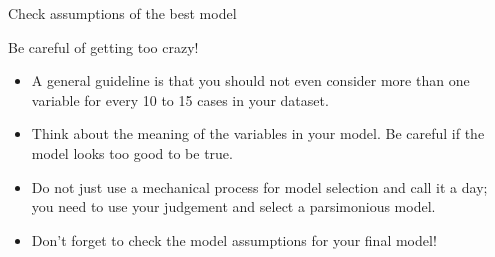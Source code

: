 \documentclass{beamer}\usepackage[]{graphicx}\usepackage[]{color}
\newenvironment{knitrout}{}{} %
\begin{document}
\begin{darkframes}
\begin{frame}[fragile]{Check assumptions of the best model}
\begin{knitrout}
\end{knitrout}

    \end{frame}

    \begin{frame}{Be careful of getting too crazy!}
      \begin{itemize}[<+->]
        \item A general guideline is that you should not even consider more than one variable for every 10 to 15 cases in your dataset.
        \item Think about the meaning of the variables in your model. Be careful if the model looks too good to be true.
        \item Do not just use a mechanical process for model selection and call it a day; you need to use your judgement and select a parsimonious model.
        \item Don't forget to check the model assumptions for your final model!
      \end{itemize}
    \end{frame}

  \end{darkframes}
\end{document}
